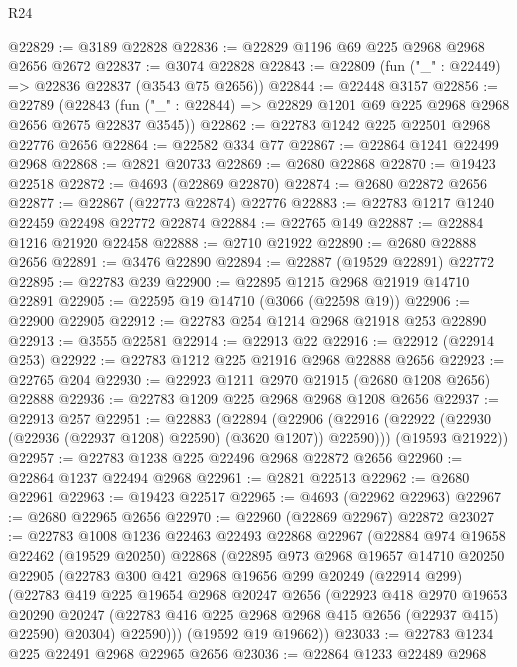 \begin{lexlean}{R24}
\begin{coremodule}
@22829 := @3189 @22828
@22836 := @22829 @1196 @69 @225 @2968 @2968 @2656 @2672
@22837 := @3074 @22828
@22843 := @22809 (fun ("_" : @22449) => @22836 @22837 (@3543 @75 @2656))
@22844 := @22448 @3157
@22856 := @22789
    (@22843 (fun ("_" : @22844) => @22829 @1201 @69 @225 @2968 @2968 @2656 @2675 @22837 @3545))
@22862 := @22783 @1242 @225 @22501 @2968 @22776 @2656
@22864 := @22582 @334 @77
@22867 := @22864 @1241 @22499 @2968
@22868 := @2821 @20733
@22869 := @2680 @22868
@22870 := @19423 @22518
@22872 := @4693 (@22869 @22870)
@22874 := @2680 @22872 @2656
@22877 := @22867 (@22773 @22874) @22776
@22883 := @22783 @1217 @1240 @22459 @22498 @22772 @22874
@22884 := @22765 @149
@22887 := @22884 @1216 @21920 @22458
@22888 := @2710 @21922
@22890 := @2680 @22888 @2656
@22891 := @3476 @22890
@22894 := @22887 (@19529 @22891) @22772
@22895 := @22783 @239
@22900 := @22895 @1215 @2968 @21919 @14710 @22891
@22905 := @22595 @19 @14710 (@3066 (@22598 @19))
@22906 := @22900 @22905
@22912 := @22783 @254 @1214 @2968 @21918 @253 @22890
@22913 := @3555 @22581
@22914 := @22913 @22
@22916 := @22912 (@22914 @253)
@22922 := @22783 @1212 @225 @21916 @2968 @22888 @2656
@22923 := @22765 @204
@22930 := @22923 @1211 @2970 @21915 (@2680 @1208 @2656) @22888
@22936 := @22783 @1209 @225 @2968 @2968 @1208 @2656
@22937 := @22913 @257
@22951 := @22883
    (@22894
      (@22906 (@22916 (@22922 (@22930 (@22936 (@22937 @1208) @22590) (@3620 @1207)) @22590)))
      (@19593 @21922))
@22957 := @22783 @1238 @225 @22496 @2968 @22872 @2656
@22960 := @22864 @1237 @22494 @2968
@22961 := @2821 @22513
@22962 := @2680 @22961
@22963 := @19423 @22517
@22965 := @4693 (@22962 @22963)
@22967 := @2680 @22965 @2656
@22970 := @22960 (@22869 @22967) @22872
@23027 := @22783
    @1008
    @1236
    @22463
    @22493
    @22868
    @22967
    (@22884
      @974
      @19658
      @22462
      (@19529 @20250)
      @22868
      (@22895
        @973
        @2968
        @19657
        @14710
        @20250
        @22905
        (@22783
          @300
          @421
          @2968
          @19656
          @299
          @20249
          (@22914 @299)
          (@22783
            @419
            @225
            @19654
            @2968
            @20247
            @2656
            (@22923
              @418
              @2970
              @19653
              @20290
              @20247
              (@22783 @416 @225 @2968 @2968 @415 @2656 (@22937 @415) @22590)
              @20304)
            @22590)))
      (@19592 @19 @19662))
@23033 := @22783 @1234 @225 @22491 @2968 @22965 @2656
@23036 := @22864 @1233 @22489 @2968

\end{coremodule}
\end{lexlean}
